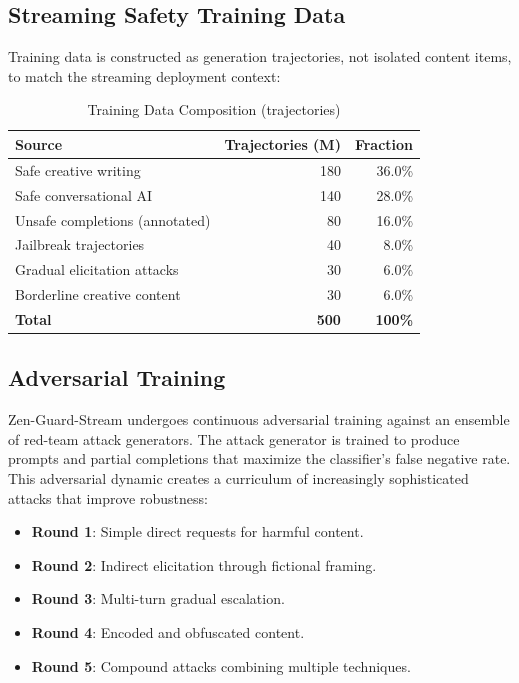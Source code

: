 \documentclass[11pt,a4paper]{article}
\begin{document}
\subsection{Streaming Safety Training Data}

Training data is constructed as generation trajectories, not isolated content items, to match the streaming deployment context:

\begin{table}[H]
\centering
\caption{Training Data Composition (trajectories)}
\begin{tabular}{lrr}
\toprule
\textbf{Source} & \textbf{Trajectories (M)} & \textbf{Fraction} \\
\midrule
Safe creative writing & 180 & 36.0\% \\
Safe conversational AI & 140 & 28.0\% \\
Unsafe completions (annotated) & 80 & 16.0\% \\
Jailbreak trajectories & 40 & 8.0\% \\
Gradual elicitation attacks & 30 & 6.0\% \\
Borderline creative content & 30 & 6.0\% \\
\midrule
\textbf{Total} & \textbf{500} & \textbf{100\%} \\
\bottomrule
\end{tabular}
\end{table}

\subsection{Adversarial Training}

Zen-Guard-Stream undergoes continuous adversarial training against an ensemble of red-team attack generators. The attack generator is trained to produce prompts and partial completions that maximize the classifier's false negative rate. This adversarial dynamic creates a curriculum of increasingly sophisticated attacks that improve robustness:

\begin{itemize}
  \item \textbf{Round 1}: Simple direct requests for harmful content.
  \item \textbf{Round 2}: Indirect elicitation through fictional framing.
  \item \textbf{Round 3}: Multi-turn gradual escalation.
  \item \textbf{Round 4}: Encoded and obfuscated content.
  \item \textbf{Round 5}: Compound attacks combining multiple techniques.
\end{itemize}
\end{document}
